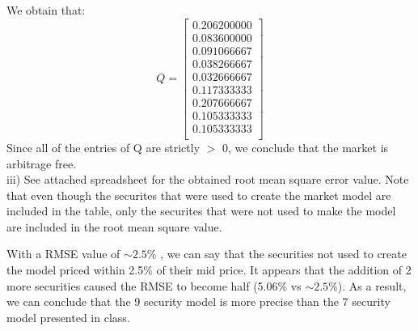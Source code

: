 \documentclass{article}
\begin{document}
We obtain that: 
\begin{equation*}
Q = %
\begin{bmatrix}{}
 0.206200000 \\ 
  0.083600000 \\ 
  0.091066667 \\ 
  0.038266667 \\ 
  0.032666667 \\ 
  0.117333333 \\ 
  0.207666667 \\ 
  0.105333333 \\ 
  0.105333333 \\ 
  \end{bmatrix}
\end{equation*}
Since all of the entries of Q are strictly $>$ 0, we conclude that the market is arbitrage free.
\vspace{5mm} \\
iii) See attached spreadsheet for the obtained root mean square error value. Note that even though the securites that were used to create the market model are included in the table, only the securites that were not used to make the model are included in the root mean square value. \par With a RMSE value of $\sim 2.5\%$ , we can say that the securities not used to create the model priced within 2.5\% of their mid price. It appears that the addition of 2 more securities caused the RMSE to become half (5.06\% vs $\sim 2.5\%$). As a result, we can conclude that the 9 security model is more precise than the 7 security model presented in class.
\end{document}
